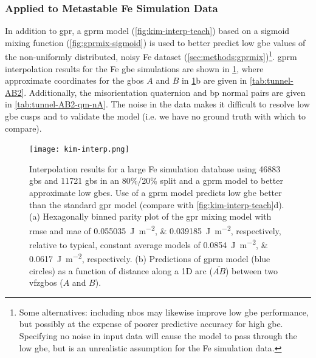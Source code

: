 \documentclass[final,twocolumn,12pt]{elsarticle}
\begin{document}
\subsubsection{ Applied to Metastable Fe Simulation Data}
\label{sec:results:simulation:gprm}
In addition to \gls{gpr}, a \gls{gprm} model (\cref{fig:kim-interp-teach}) based on a sigmoid mixing function (\cref{fig:gprmix-sigmoid}) is used to better predict low \gls{gbe} values of the non-uniformly distributed, noisy Fe dataset (\cref{sec:methods:gprmix})\footnote{Some alternatives: including \glspl{nbo} may likewise improve low \gls{gbe} performance, but possibly at the expense of poorer predictive accuracy for high \gls{gbe}. Specifying no noise in input data will cause the model to pass through the low \gls{gbe}, but is an unrealistic assumption for the Fe simulation data.}. \Gls{gprm} interpolation results for the Fe \gls{gbe} simulations \cite{kimPhasefieldModeling3D2014} are shown in \cref{fig:kim-interp}, where approximate coordinates for the \glspl{gbo} $A$ and $B$ in \cref{fig:kim-interp}b are given in \cref{tab:tunnel-AB2}. Additionally, the misorientation quaternion and \gls{bp} normal pairs are given in \cref{tab:tunnel-AB2-qm-nA}. The noise in the data makes it difficult to resolve low \gls{gbe} cusps and to validate the model (i.e. we have no ground truth with which to compare).
%
%
\begin{figure}
    \centering
    \texttt{[image: kim-interp.png]}
    \caption{Interpolation results for a large Fe simulation database \cite{kimPhasefieldModeling3D2014} using \num{46883} \inpt{} \glspl{gb} and \num{11721} \outpt{} \glspl{gb} in an 80\%/20\% split and a \gls{gprm} model to better approximate low \glspl{gbe}. Use of a \gls{gprm} model predicts low \gls{gbe} better than the standard \gls{gpr} model (compare with \cref{fig:kim-interp-teach}d). (a) Hexagonally binned parity plot of the \gls{gpr} mixing model with \gls{rmse} and \gls{mae} of \SIlist{0.055035;0.039185}{\J\per\square\meter}, respectively, relative to typical, constant average models of \SIlist{0.0854;0.0617}{\joule\per\square\meter}, respectively. (b) Predictions of \gls{gprm} model (blue circles) as a function of distance along a 1D arc ($\overline{AB}$) between two \glspl{vfzgbo} ($A$ and $B$). }
    \label{fig:kim-interp}
\end{figure}
\end{document}
